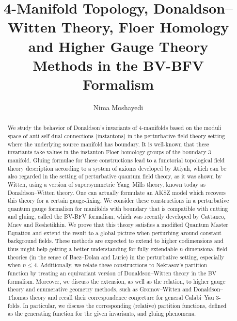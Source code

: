 \documentclass[11pt,colorinlistoftodos]{amsart}
\title[Higher Gauge Theory Methods in the BV-BFV Formalism]{4-Manifold Topology, Donaldson--Witten Theory, Floer Homology and Higher Gauge Theory Methods in the BV-BFV Formalism}
\author[N. Moshayedi]{Nima Moshayedi}
\numberwithin{equation}{subsection}
\theoremstyle{plain}
\theoremstyle{definition}
\theoremstyle{remark}
\begin{document}
\makeatletter
\providecommand\@dotsep{5}
\def\listtodoname{List of Todos}
\def\listoftodos{\@starttoc{tdo}\listtodoname}
\makeatother

\maketitle



\begin{abstract}
We study the behavior of Donaldson's invariants of 4-manifolds based on the moduli space of anti self-dual connections (instantons) in the perturbative field theory setting where the underlying source manifold has boundary. It is well-known that these invariants take values in the instanton Floer homology groups of the boundary 3-manifold. Gluing formulae for these constructions lead to a functorial topological field theory description according to a system of axioms developed by Atiyah, which can be also regarded in the setting of perturbative quantum field theory, as it was shown by Witten, using a version of supersymmetric Yang--Mills theory, known today as Donaldson--Witten theory. One can actually formulate an AKSZ model which recovers this theory for a certain gauge-fixing. We consider these constructions in a perturbative quantum gauge formalism for manifolds with boundary that is compatible with cutting and gluing, called the BV-BFV formalism, which was recently developed by Cattaneo, Mnev and Reshetikhin. We prove that this theory satisfies a modified Quantum Master Equation and extend the result to a global picture when perturbing around constant background fields. These methods are expected to extend to higher codimensions and thus might help getting a better understanding for fully extendable $n$-dimensional field theories (in the sense of Baez--Dolan and Lurie) in the perturbative setting, especially when $n\leq 4$.
Additionally, we relate these constructions to Nekrasov's partition function by treating an equivariant version of Donaldson--Witten theory in the BV formalism.
Moreover, we discuss the extension, as well as the relation, to higher gauge theory and enumerative geometry methods, such as Gromov--Witten and Donaldson--Thomas theory and recall their correspondence conjecture for general Calabi--Yau 3-folds. In particular, we discuss the corresponding (relative) partition functions, defined as the generating function for the given invariants, and gluing phenomena.
\end{abstract}
\end{document}

